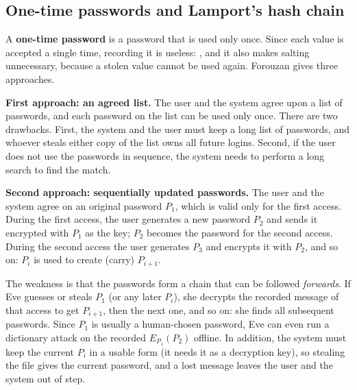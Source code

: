 \subsection{One-time passwords and Lamport's hash chain \hot\new}

A \textbf{one-time password} is a password that is used only once. Since each value is accepted a single time, recording it is useless: , and it also makes salting unnecessary, because a stolen value cannot be used again. Forouzan gives three approaches.

\textbf{First approach: an agreed list.} The user and the system agree upon a list of passwords, and each password on the list can be used only once. There are two drawbacks. First, the system and the user must keep a long list of passwords, and whoever steals either copy of the list owns all future logins. Second, if the user does not use the passwords in sequence, the system needs to perform a long search to find the match.

\textbf{Second approach: sequentially updated passwords.} The user and the system agree on an original password $P_1$, which is valid only for the first access. During the first access, the user generates a new password $P_2$ and sends it encrypted with $P_1$ as the key; $P_2$ becomes the password for the second access. During the second access the user generates $P_3$ and encrypts it with $P_2$, and so on: $P_i$ is used to create (carry) $P_{i+1}$.
\begin{center}
\end{center}
The weakness is that the passwords form a chain that can be followed \emph{forwards}. If Eve guesses or steals $P_1$ (or any later $P_i$), she decrypts the recorded message of that access to get $P_{i+1}$, then the next one, and so on: she finds all subsequent passwords. Since $P_1$ is usually a human-chosen password, Eve can even run a dictionary attack on the recorded $E_{P_1}(P_2)$ offline. In addition, the system must keep the current $P_i$ in a usable form (it needs it as a decryption key), so stealing the file gives the current password, and a lost message leaves the user and the system out of step.

